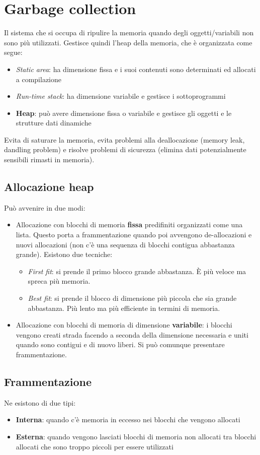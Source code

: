 \newpage
\section{Garbage collection}
Il sistema che si occupa di ripulire la memoria quando degli oggetti/variabili non sono più utilizzati. Gestisce quindi l'heap della memoria, che è organizzata come segue:
\begin{itemize}
	\item \textit{Static area}: ha dimensione fissa e i suoi contenuti sono determinati ed allocati a compilazione
	\item \textit{Run-time stack}: ha dimensione variabile e gestisce i sottoprogrammi
	\item \textbf{Heap}: può avere dimensione fissa o variabile e gestisce gli oggetti e le strutture dati dinamiche
\end{itemize}
Evita di saturare la memoria, evita problemi alla deallocazione (memory leak, dandling problem) e risolve problemi di sicurezza (elimina dati potenzialmente sensibili rimasti in memoria).
\subsection{Allocazione heap}
Può avvenire in due modi:
\begin{itemize}
	\item Allocazione con blocchi di memoria \textbf{fissa} predifiniti organizzati come una lista. Questo porta a frammentazione quando poi avvengono de-allocazioni e nuovi allocazioni (non c'è una sequenza di blocchi contigua abbastanza grande). Esistono due tecniche:
	\begin{itemize}
		\item \textit{First fit}: si prende il primo blocco grande abbastanza. È più veloce ma spreca più memoria.
		\item \textit{Best fit}: si prende il blocco di dimensione più piccola che sia grande abbastanza. Più lento ma più efficiente in termini di memoria.
	\end{itemize}
	\item Allocazione con blocchi di memoria di dimensione \textbf{variabile}: i blocchi vengono creati strada facendo a seconda della dimensione necessaria e uniti quando sono contigui e di nuovo liberi. Si può comunque presentare frammentazione.
\end{itemize}
\subsection{Frammentazione}
Ne esistono di due tipi:
\begin{itemize}
	\item \textbf{Interna}: quando c'è memoria in eccesso nei blocchi che vengono allocati
	\item \textbf{Esterna}: quando vengono lasciati blocchi di memoria non allocati tra blocchi allocati che sono troppo piccoli per essere utilizzati
\end{itemize}
